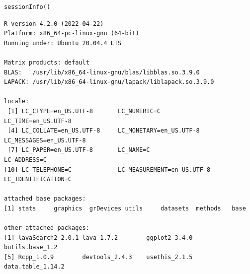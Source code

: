 \documentclass[12pt]{article}
\begin{document}
\lstset{language=r,label= ,caption= ,captionpos=b,numbers=none}
\begin{lstlisting}
sessionInfo()
\end{lstlisting}

\begin{verbatim}
R version 4.2.0 (2022-04-22)
Platform: x86_64-pc-linux-gnu (64-bit)
Running under: Ubuntu 20.04.4 LTS

Matrix products: default
BLAS:   /usr/lib/x86_64-linux-gnu/blas/libblas.so.3.9.0
LAPACK: /usr/lib/x86_64-linux-gnu/lapack/liblapack.so.3.9.0

locale:
 [1] LC_CTYPE=en_US.UTF-8       LC_NUMERIC=C               LC_TIME=en_US.UTF-8       
 [4] LC_COLLATE=en_US.UTF-8     LC_MONETARY=en_US.UTF-8    LC_MESSAGES=en_US.UTF-8   
 [7] LC_PAPER=en_US.UTF-8       LC_NAME=C                  LC_ADDRESS=C              
[10] LC_TELEPHONE=C             LC_MEASUREMENT=en_US.UTF-8 LC_IDENTIFICATION=C       

attached base packages:
[1] stats     graphics  grDevices utils     datasets  methods   base     

other attached packages:
[1] lavaSearch2_2.0.1 lava_1.7.2        ggplot2_3.4.0     butils.base_1.2  
[5] Rcpp_1.0.9        devtools_2.4.3    usethis_2.1.5     data.table_1.14.2


\end{verbatim}
\end{document}
